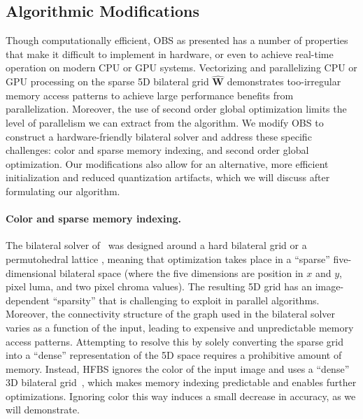 \subsection{Algorithmic Modifications}\label{sec:alg_mod}
Though computationally efficient, OBS as presented has a number of properties that make it difficult to implement in hardware, or even to achieve real-time operation on modern CPU or GPU systems.
Vectorizing and parallelizing CPU or GPU processing on the sparse 5D bilateral grid $\mathbf{\hat W}$ demonstrates too-irregular memory access patterns to achieve large performance benefits from parallelization.
Moreover, the use of second order global optimization limits the level of parallelism we can extract from the algorithm.
We modify OBS to construct a hardware-friendly bilateral solver and address these specific challenges: color and sparse memory indexing, and second order global optimization.
Our modifications also allow for an alternative, more efficient initialization and reduced quantization artifacts, which we will discuss after formulating our algorithm.

\paragraph{Color and sparse memory indexing.}
The bilateral solver of~\cite{BarronPoole2016} was designed around a hard bilateral grid or a permutohedral lattice \cite{Adams2010}, meaning that optimization takes place in a ``sparse'' five-dimensional bilateral space (where the five dimensions are position in $x$ and $y$, pixel luma, and two pixel chroma values).
The resulting 5D grid has an image-dependent ``sparsity'' that is challenging to exploit in parallel algorithms.
Moreover, the connectivity structure of the graph used in the bilateral solver varies as a function of the input, leading to expensive and unpredictable memory access patterns.
Attempting to resolve this by solely converting the sparse grid into a ``dense'' representation of the 5D space requires a prohibitive amount of memory.
Instead, HFBS ignores the color of the input image and uses a ``dense'' 3D bilateral grid~\cite{Chen2007}, which makes memory indexing predictable and enables further optimizations. Ignoring color this way induces a small decrease in accuracy, as we will demonstrate.

